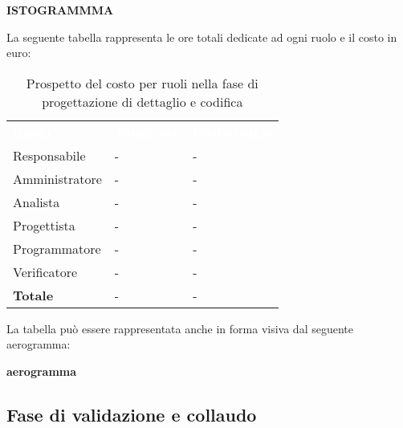 \textbf{ISTOGRAMMMA}


La seguente tabella rappresenta le ore totali dedicate ad ogni ruolo e il costo in euro:

\begin{table}[!htbp]
\begin{center}
\renewcommand{\arraystretch}{1.5}
\begin{tabular}{ m{}<{\centering}  m{}<{\centering} m{}<{\centering}}
	\rowcolor{darkblue}
	\textcolor{white}{\textbf{Ruolo}}&\textcolor{white}{\textbf{Totale ore}}&\textcolor{white}{\textbf{Costo totale}}\\ 

	Responsabile  & - & - \\	

	Amministratore & - & - \\
	
	Analista & - & - \\
	
	Progettista & - & - \\
	
	Programmatore & - & - \\
	
	Verificatore & - & - \\
	
	\textbf{Totale} & - & - \\
	
\end{tabular}
\caption{Prospetto del costo per ruoli nella fase di progettazione di dettaglio e codifica}
\end{center}
\end{table}

La tabella può essere rappresentata anche in forma visiva dal seguente aerogramma:

\textbf{aerogramma}

\subsection{Fase di validazione e collaudo}
